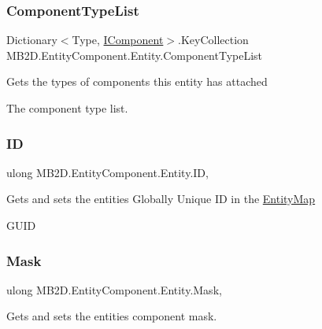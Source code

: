 \subsubsection{\texorpdfstring{Component\+Type\+List}{ComponentTypeList}}
{\footnotesize\ttfamily Dictionary$<$Type, \hyperlink{interface_m_b2_d_1_1_entity_component_1_1_i_component}{I\+Component}$>$.Key\+Collection M\+B2\+D.\+Entity\+Component.\+Entity.\+Component\+Type\+List\hspace{0.3cm}{\ttfamily [get]}}



Gets the types of components this entity has attached 

The component type list.\hypertarget{class_m_b2_d_1_1_entity_component_1_1_entity_a915dff6f7cff6dbf93377df68fab7c0e}{}\label{class_m_b2_d_1_1_entity_component_1_1_entity_a915dff6f7cff6dbf93377df68fab7c0e} 
\subsubsection{\texorpdfstring{ID}{ID}}
{\footnotesize\ttfamily ulong M\+B2\+D.\+Entity\+Component.\+Entity.\+ID\hspace{0.3cm}{\ttfamily [get]}, {\ttfamily [set]}}



Gets and sets the entities Globally Unique ID in the \hyperlink{class_m_b2_d_1_1_entity_component_1_1_entity_map}{Entity\+Map} 

G\+U\+ID\hypertarget{class_m_b2_d_1_1_entity_component_1_1_entity_ada6cfb14adbc299a3b5616f833e4eb46}{}\label{class_m_b2_d_1_1_entity_component_1_1_entity_ada6cfb14adbc299a3b5616f833e4eb46} 
\subsubsection{\texorpdfstring{Mask}{Mask}}
{\footnotesize\ttfamily ulong M\+B2\+D.\+Entity\+Component.\+Entity.\+Mask\hspace{0.3cm}{\ttfamily [get]}, {\ttfamily [set]}}



Gets and sets the entities component mask. 

